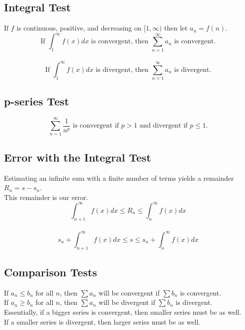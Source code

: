 \documentclass[12pt]{article}
\begin{document}
\subsection{Integral Test}

If $f$ is continuous, positive, and decreasing on $[1, \infty)$ then let $a_n = f(n)$.\\
\begin{displaymath}
\text{If }\int_{1}^{\infty} f(x)dx\text{ is convergent, then }\sum_{n=1}^{\infty} a_n\text{ is convergent.}
\end{displaymath}
\\
\begin{displaymath}
\text{If }\int_{1}^{\infty} f(x)dx\text{ is divergent, then }\sum_{n=1}^{\infty} a_n\text{ is divergent.}
\end{displaymath}


\subsection{p-series Test}

\begin{displaymath}
\sum_{n=1}^{\infty} \frac{1}{n^p}\text{ is convergent if }p > 1\text{ and divergent if }p \leq 1\text{.}
\end{displaymath}


\subsection{Error with the Integral Test}

Estimating an infinite sum with a finite number of terms yields a remainder $R_n = s - s_n$.\\
This remainder is our error.\\
\begin{displaymath}
\int_{n+1}^{\infty} f(x)dx \leq R_n \leq \int_{n}^{\infty} f(x)dx
\end{displaymath}
\\
\begin{displaymath}
s_n + \int_{n+1}^{\infty} f(x)dx \leq s \leq s_n + \int_{n}^{\infty} f(x)dx
\end{displaymath}


\subsection{Comparison Tests}

If $a_n \leq b_n$ for all $n$, then $\sum a_n$ will be convergent if $\sum b_n$ is convergent.\\
If $a_n \geq b_n$ for all $n$, then $\sum a_n$ will be divergent if $\sum b_n$ is divergent.\\
Essentially, if a bigger series is convergent, then smaller series must be as well.\\
If a smaller series is divergent, then larger series must be as well.
\end{document}
